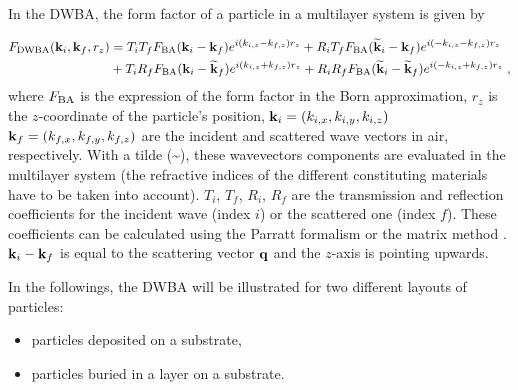  In the DWBA, the form factor of a particle in a multilayer system is given by

\begin{align}
F_{\rm{DWBA}} (\mathbf{k}_i,\mathbf{k}_f, r_z) & = T_i T_f F_{\rm{BA}} (\mathbf{k}_i-\mathbf{k}_f) e^{i (k_{i,z}-k_{f,z}) r_z} + R_i T_f F_{\rm{BA}}(\mathbf{\widetilde{k}}_i-\mathbf{k}_f) e^{i(-k_{i,z}-k_{f,z})r_z}
 \nonumber \\
  &+ T_i R_f F_{\rm{BA}}(\mathbf{k}_i-\mathbf{\widetilde{k}}_f)e^{i(k_{i,z}+k_{f,z})r_z} + R_iR_fF_{\rm{BA}} (\mathbf{\widetilde{k}}_i-\mathbf{\widetilde{k}}_f)e^{i(-k_{i,z}+k_{f,z})r_z} \; , \label{eq:dwbageneral}
\end{align}
where $F_{\rm{BA}}$ is the expression of the form factor in the Born approximation, $r_z$ is the $z$-coordinate of the particle's position, $\mathbf{k}_i=(k_{i,x}, k_{i,y}, k_{i,z})$ $\mathbf{k}_f=(k_{f,x}, k_{f,y}, k_{f,z})$ are the incident and scattered wave vectors in air, respectively. With a tilde (\~{}), these wavevectors components are evaluated in the multilayer system (the refractive indices of the different constituting materials have to be taken into account). 
$T_i$, $T_f$, $R_i$, $R_f$ are the transmission and reflection coefficients for the incident wave (index $i$) or the scattered one (index $f$). These coefficients can be calculated using the Parratt formalism \cite{Parr54} or the matrix method \cite{BoWo99}. $\mathbf{k}_i-\mathbf{k}_f$ is equal to the scattering vector $\mathbf{q}$ and the $z$-axis is pointing upwards.\\



\vspace{18pt}

In the followings, the DWBA will be illustrated for two different layouts of particles: 
\begin{itemize}
\item particles deposited on a substrate,
\item particles buried in a layer on a substrate.
\end{itemize}
